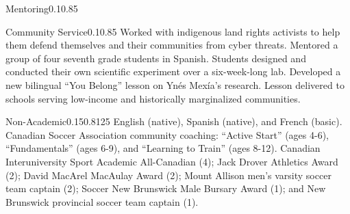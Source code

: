 \documentclass{federico_cv}
\begin{document}
\begin{tblSection}{Mentoring}{0.1}{0.85}



\end{tblSection}

\clearpage

\begin{tblSection}{Community Service}{0.1}{0.85}
{Worked with indigenous land rights activists to help them defend themselves and their communities from cyber threats.}
{Mentored a group of four seventh grade students in Spanish.}
{Students designed and conducted their own scientific experiment over a six-week-long lab.}
{Developed a new bilingual ``You Belong'' lesson on Ynés Mexía's research.} 
{Lesson delivered to schools serving low-income and historically marginalized communities.}
\end{tblSection}

\begin{tblSection}{Non-Academic}{0.15}{0.8125}
{English (native), Spanish (native), and French (basic).}
{Canadian Soccer Association community coaching: ``Active Start'' (ages 4-6), 
``Fundamentals'' (ages 6-9), and ``Learning to Train'' (ages 8-12).}
{Canadian Interuniversity Sport Academic All-Canadian (4); Jack Drover Athletics 
Award (2); David MacArel MacAulay Award (2); Mount Allison men's varsity soccer 
team captain (2); Soccer New Brunswick Male Bursary Award (1); and New Brunswick 
provincial soccer team captain (1).}
\end{tblSection}
\end{document}
